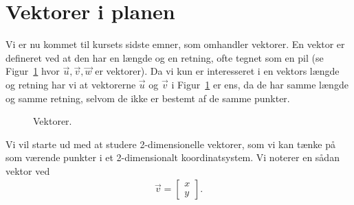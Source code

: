 \section{Vektorer i planen}
\noindent Vi er nu kommet til kursets sidste emner, som omhandler vektorer. En vektor er defineret ved at den har en længde og en retning, ofte tegnet som en pil (se Figur~\ref{fig:vec2d1et} hvor $\vec{u},\vec{v},\vec{w}$ er vektorer). Da vi kun er interesseret i en vektors længde og retning har vi at vektorerne $\vec{u}$ og $\vec{v}$ i Figur~\ref{fig:vec2d1et} er ens, da de har samme længde og samme retning, selvom de ikke er bestemt af de samme punkter. 

\begin{figure}[h!]
\centering
{}
\caption{Vektorer.}
\label{fig:vec2d1et}
\end{figure}

Vi vil starte ud med at studere 2-dimensionelle vektorer, som vi kan tænke på som værende punkter i et 2-dimensionalt koordinatsystem. Vi noterer en sådan vektor ved
\begin{align*}
\vec{v}=\begin{bmatrix}
x \\
y
\end{bmatrix}.
\end{align*}
